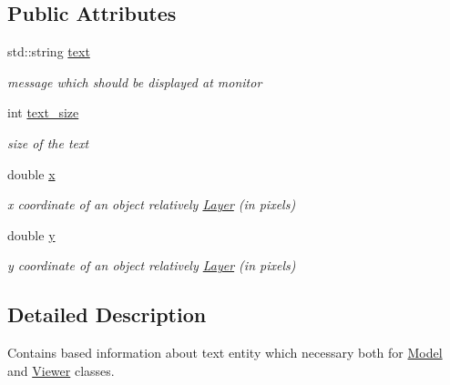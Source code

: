 \subsection*{Public Attributes}
\begin{DoxyCompactItemize}
\item 
\mbox{\label{class_text_object_a89e65c86a7c0bd9dfbcf759e49c7660e}} 
std\+::string \hyperlink{class_text_object_a89e65c86a7c0bd9dfbcf759e49c7660e}{text}
\begin{DoxyCompactList}\small\item\em message which should be displayed at monitor \end{DoxyCompactList}\item 
\mbox{\label{class_text_object_a3a2dc3c26c74c36885808dea05813a47}} 
int \hyperlink{class_text_object_a3a2dc3c26c74c36885808dea05813a47}{text\+\_\+size}
\begin{DoxyCompactList}\small\item\em size of the text \end{DoxyCompactList}\item 
\mbox{\label{class_text_object_a8d3ff37567717527671500ed9b2bd02a}} 
double \hyperlink{class_text_object_a8d3ff37567717527671500ed9b2bd02a}{x}
\begin{DoxyCompactList}\small\item\em x coordinate of an object relatively \hyperlink{class_layer}{Layer} (in pixels) \end{DoxyCompactList}\item 
\mbox{\label{class_text_object_a0aa9a294298001812ec8c3b9ca990ef2}} 
double \hyperlink{class_text_object_a0aa9a294298001812ec8c3b9ca990ef2}{y}
\begin{DoxyCompactList}\small\item\em y coordinate of an object relatively \hyperlink{class_layer}{Layer} (in pixels) \end{DoxyCompactList}\end{DoxyCompactItemize}


\subsection{Detailed Description}
Contains based information about text entity which necessary both for \hyperlink{class_model}{Model} and \hyperlink{class_viewer}{Viewer} classes. 

